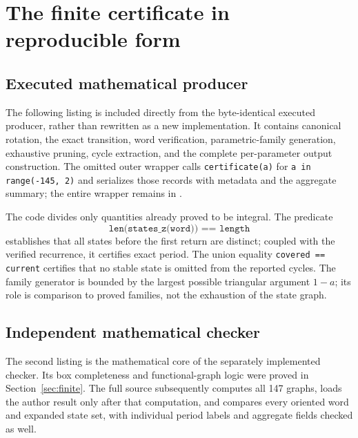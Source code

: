 \section{The finite certificate in reproducible form}
\label{app:certificate}

\subsection{Executed mathematical producer}

The following listing is included directly from the byte-identical
executed producer, rather than rewritten as a new implementation.
It contains canonical rotation, the exact transition, word
verification, parametric-family generation, exhaustive pruning,
cycle extraction, and the complete per-parameter output construction.
The omitted outer wrapper calls \texttt{certificate(a)} for
\texttt{a in range(-145, 2)} and serializes those records with
metadata and the aggregate summary; the entire wrapper remains
in .



The code divides only quantities already proved to be integral.
The predicate
\[
 \texttt{len(states\_z(word)) == length}
\]
establishes
that all states before the first return are distinct; coupled
with the verified recurrence, it certifies exact period.
The union equality \texttt{covered == current} certifies that
no stable state is omitted from the reported cycles.
The family generator is bounded by the largest possible
triangular argument $1-a$; its role is comparison to proved
families, not the exhaustion of the state graph.

\subsection{Independent mathematical checker}

The second listing is the mathematical core of the separately
implemented checker. Its box completeness and functional-graph
logic were proved in Section~\ref{sec:finite}.
The full source subsequently computes all 147 graphs, loads the
author result only after that computation, and compares every
oriented word and expanded state set, with individual period
labels and aggregate fields checked as well.



